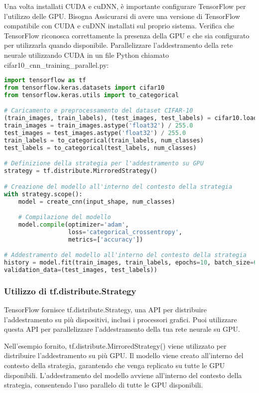 \documentclass{article}
\begin{document}
Una volta installati CUDA e cuDNN, è importante configurare TensorFlow per l'utilizzo delle GPU. Bisogna Assicurarsi di avere una versione di TensorFlow compatibile con CUDA e cuDNN installati sul proprio sistema. Verifica che TensorFlow riconosca correttamente la presenza della GPU e che sia configurato per utilizzarla quando disponibile.
 Parallelizzare l'addestramento della rete neurale utilizzando CUDA in un file Python chiamato cifar10\_cnn\_training\_parallel.py:
 \begin{lstlisting}[language=Python, caption={l'addestramento della rete neurale utilizzando CUDA in un file Python}]
 import tensorflow as tf
from tensorflow.keras.datasets import cifar10
from tensorflow.keras.utils import to_categorical

# Caricamento e preprocessamento del dataset CIFAR-10
(train_images, train_labels), (test_images, test_labels) = cifar10.load_data()
train_images = train_images.astype('float32') / 255.0
test_images = test_images.astype('float32') / 255.0
train_labels = to_categorical(train_labels, num_classes)
test_labels = to_categorical(test_labels, num_classes)

# Definizione della strategia per l'addestramento su GPU
strategy = tf.distribute.MirroredStrategy()

# Creazione del modello all'interno del contesto della strategia
with strategy.scope():
    model = create_cnn(input_shape, num_classes)

    # Compilazione del modello
    model.compile(optimizer='adam',
                  loss='categorical_crossentropy',
                  metrics=['accuracy'])

# Addestramento del modello all'interno del contesto della strategia
history = model.fit(train_images, train_labels, epochs=10, batch_size=64,
validation_data=(test_images, test_labels))

 \end{lstlisting}

\subsubsection{Utilizzo di tf.distribute.Strategy}

TensorFlow fornisce tf.distribute.Strategy, una API per distribuire l'addestramento su più dispositivi, inclusi i processori grafici. Puoi utilizzare questa API per parallelizzare l'addestramento della tua rete neurale su GPU.

Nell'esempio fornito, tf.distribute.MirroredStrategy() viene utilizzato per distribuire l'addestramento su più GPU. Il modello viene creato all'interno del contesto della strategia, garantendo che venga replicato su tutte le GPU disponibili. L'addestramento del modello avviene all'interno del contesto della strategia, consentendo l'uso parallelo di tutte le GPU disponibili.
\end{document}
